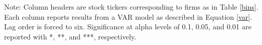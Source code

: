 \documentclass[11pt]{article}
\begin{document}
\begin{table}[!htbp] \centering 
	\caption{Bivariate Time Series Model with D4 RINs} 
	\label{d4timeseries6lags} 
	\begin{flushleft}
		\scriptsize{Note: Column headers are stock tickers corresponding to firms as in Table \ref{bins}. Each column reports results from a VAR model as described in Equation \ref{var}. Lag order is forced to six. Significance at alpha levels of 0.1, 0.05, and 0.01 are reported with *, **, and ***, respectively.}\\
	\end{flushleft}
\end{table} 
\end{document}
